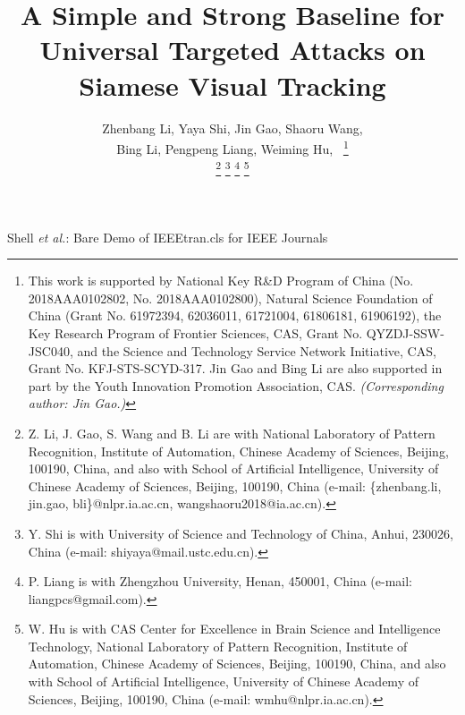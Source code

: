 \documentclass[journal]{IEEEtran}
\begin{document}
\title{A Simple and Strong Baseline for Universal Targeted Attacks on Siamese Visual Tracking}
\author{
  Zhenbang Li, Yaya Shi, Jin Gao, Shaoru Wang,\\ Bing Li, Pengpeng Liang, Weiming Hu,~
  \thanks{This work is supported by National Key R\&D Program of China (No. 2018AAA0102802, No. 2018AAA0102800), Natural Science Foundation of China (Grant No. 61972394, 62036011, 61721004, 61806181, 61906192), the Key Research Program of Frontier Sciences, CAS, Grant No. QYZDJ-SSW-JSC040, and the Science and Technology Service Network Initiative, CAS, Grant No. KFJ-STS-SCYD-317. Jin Gao and Bing Li are also supported in part by the Youth Innovation Promotion Association, CAS. \textit{(Corresponding author: Jin Gao.)}}
  
  \thanks{Z. Li, J. Gao, S. Wang and B. Li are with National Laboratory of Pattern Recognition, Institute of Automation, Chinese Academy of Sciences, Beijing, 100190, China, and also with School of Artificial Intelligence, University of Chinese Academy of Sciences, Beijing, 100190, China (e-mail: \{zhenbang.li, jin.gao, bli\}@nlpr.ia.ac.cn, wangshaoru2018@ia.ac.cn).}
  \thanks{Y. Shi is with University of Science and Technology of China, Anhui, 230026, China (e-mail: shiyaya@mail.ustc.edu.cn).}
  \thanks{P. Liang is with Zhengzhou University, Henan, 450001, China (e-mail: liangpcs@gmail.com).}
  \thanks{W. Hu is with CAS Center for Excellence in Brain Science and Intelligence Technology, National Laboratory of Pattern Recognition, Institute of Automation, Chinese Academy of Sciences, Beijing, 100190, China, and also with School of Artificial Intelligence, University of Chinese Academy of Sciences, Beijing, 100190, China (e-mail: wmhu@nlpr.ia.ac.cn).}
}

{Shell \MakeLowercase{\textit{et al.}}: Bare Demo of IEEEtran.cls for IEEE Journals}
\maketitle
\end{document}
